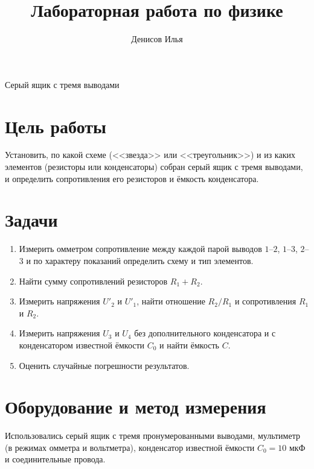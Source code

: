 \documentclass[12pt]{article}
\title{Лабораторная работа по физике}
\author{Денисов Илья}
\date{}
\begin{document}
    \maketitle

    \vspace{5cm}
    {\centering \LARGE Серый ящик с тремя выводами \par}

    \newpage

    \tableofcontents
    \setcounter{tocdepth}{3}

    \newpage

    \section{Цель работы}

    Установить, по какой схеме (<<звезда>> или <<треугольник>>) и из каких элементов (резисторы или конденсаторы) собран серый ящик с тремя выводами, и определить сопротивления его резисторов и ёмкость конденсатора.

    \section{Задачи}

    \begin{enumerate}
        \item Измерить омметром сопротивление между каждой парой выводов $1$--$2$, $1$--$3$, $2$--$3$ и по характеру показаний определить схему и тип элементов.
        \item Найти сумму сопротивлений резисторов $R_1 + R_2$.
        \item Измерить напряжения $U'_2$ и $U'_1$, найти отношение $R_2/R_1$ и сопротивления $R_1$ и $R_2$.
        \item Измерить напряжения $U_3$ и $U_4$ без дополнительного конденсатора и с конденсатором известной ёмкости $C_0$ и найти ёмкость $C$.
        \item Оценить случайные погрешности результатов.
    \end{enumerate}

    \section{Оборудование и метод измерения}

    Использовались серый ящик с тремя пронумерованными выводами, мультиметр (в режимах омметра и вольтметра), конденсатор известной ёмкости $C_0 = 10$ мкФ и соединительные провода.
\end{document}
